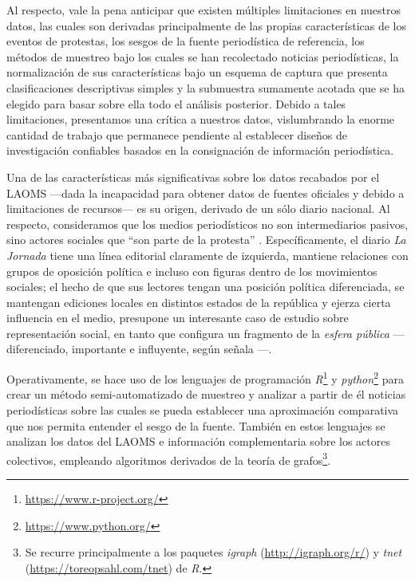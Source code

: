 \documentclass[letterpaper, 11pt]{book}
\theoremstyle{definition}
\theoremstyle{remark}
\begin{document}
Al respecto, vale la pena anticipar que existen múltiples limitaciones en nuestros datos, las cuales son derivadas principalmente de las propias características de los eventos de protestas, los sesgos de la fuente periodística de referencia, los métodos de muestreo bajo los cuales se han recolectado noticias periodísticas, la normalización de sus características bajo un esquema de captura que presenta clasificaciones descriptivas simples y la submuestra sumamente acotada que se ha elegido para basar sobre ella todo el análisis posterior. 
Debido a tales limitaciones, presentamos una crítica a nuestros datos, vislumbrando la enorme cantidad de trabajo que permanece pendiente al establecer diseños de investigación confiables basados en la consignación de información periodística. 

Una de las características más significativas sobre los datos recabados por el LAOMS ---dada la incapacidad para obtener datos de fuentes oficiales y debido a limitaciones de recursos--- es su origen, derivado de un sólo diario nacional. 
Al respecto, consideramos que los medios periodísticos no son intermediarios pasivos, sino actores sociales que ``son parte de la protesta'' \citep[108]{2003_Wada_Tesis}. 
Específicamente, el diario \emph{La Jornada} tiene una línea editorial claramente de izquierda, mantiene relaciones con grupos de oposición política e incluso con figuras dentro de los movimientos sociales; el hecho de que sus lectores tengan una posición política diferenciada, se mantengan ediciones locales en distintos estados de la república y ejerza cierta influencia en el medio, presupone un interesante caso de estudio sobre representación social, en tanto que configura un fragmento de la \emph{esfera pública} ---diferenciado, importante e influyente, según señala \citet{2003_Wada_Tesis}---.


Operativamente, se hace uso de los lenguajes de programación \emph{R}\footnote{
    \url{https://www.r-project.org/}
} y  \emph{python}\footnote{
    \url{https://www.python.org/}
} para crear un método semi-automatizado de muestreo y analizar a partir de él noticias periodísticas sobre las cuales se pueda establecer una aproximación comparativa que nos permita entender el sesgo de la fuente. 
También en estos lenguajes se analizan los datos del LAOMS e información complementaria sobre los actores colectivos, empleando algoritmos derivados de la teoría de grafos\footnote{
    Se recurre principalmente a los paquetes \emph{igraph} (\url{http://igraph.org/r/}) y \emph{tnet} (\url{https://toreopsahl.com/tnet}) de \emph{R}.
}.
\end{document}

